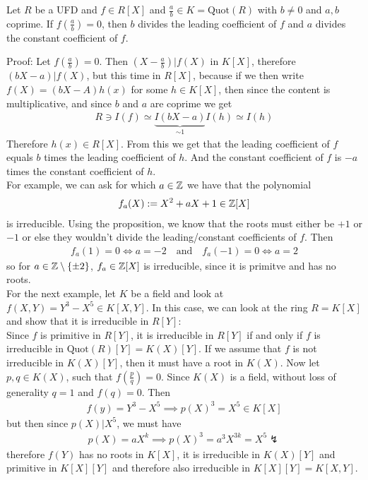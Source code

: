 \begin{proposition}[]
	Let $R$ be a UFD and $f \in R[X]$ and $\frac{a}{b} \in K = \text{Quot}(R)$ with $b \neq 0$ and $a,b$ coprime. If $f(\frac{a}{b}) = 0$, then $b$ divides the leading coefficient of $f$ and $a$ divides the constant  coefficient of $f$.
\end{proposition}
Proof: Let $f(\frac{a}{b}) = 0$. Then $(X - \frac{a}{b})|f(X)$ in $K[X]$, therefore $(bX - a)| f(X)$, but this time in $R[X]$, because if we then write $f(X) = (bX-A)h(x)$ for some $h \in K[X]$, then since the content is multiplicative, and since $b$ and $a$ are coprime we get
\begin{align*}
	R \ni I(f) \simeq \underbrace{I(b X - a)}_{\sim 1} I(h) \simeq I(h)
\end{align*}
Therefore $h(x) \in R[X]$. From this we get that the leading coefficient of $f$ equals $b$ times the leading coefficient of $h$. And the constant coefficient of $f$ is $-a$ times the constant coefficient of $h$.\\

For example, we can ask for which $a \in \mathbb{Z}$ we have that the polynomial
\begin{align*}
	f_a(X) := X^2 + a X + 1 \in \mathbb{Z}[X]
\end{align*}
is irreducible. Using the proposition, we know that the roots must either be $+1$ or $-1$ or else they wouldn't divide the leading/constant coefficients of $f$. Then
\begin{align*}
	f_a(1) = 0 \iff a = -2 \quad \text{and} \quad f_a(-1) = 0 \iff a = 2
\end{align*}
so for $a \in \mathbb{Z} \setminus \{\pm 2\}$, $f_a \in \mathbb{Z}[X]$ is irreducible, since it is primitve and has no roots.\\

For the next example, let $K$ be a field and look at $f(X,Y) = Y^3 - X^5 \in K[X,Y]$. In this case, we can look at the ring $R = K[X]$ and show that it is irreducible in $R[Y]$:\\

Since $f$ is primitive in $R[Y]$, it is irreducible in $R[Y]$ if and only if $f$ is irreducible in $\text{Quot}(R)[Y] = K(X)[Y]$. If we assume that $f$ is not irreducible in $K(X)[Y]$, then it must have a root in $K(X)$. Now let $p,q \in K(X)$, such that $f(\frac{p}{q}) = 0$. Since $K(X)$ is a field, without loss of generality $q = 1$ and $f(q) = 0$. Then 
\begin{align*}
	f(y) = Y^3 - X^5 \implies p(X)^3 = X^5 \in K[X]
\end{align*}
but then since $p(X) | X^5$, we must have
\begin{align*}
	p(X) = aX^k \implies p(X)^3 = a^3 X^{3k} = X^5 \lightning
\end{align*}
therefore $f(Y)$ has no roots in $K[X]$, it is irreducible in $K(X)[Y]$ and primitive in $K[X][Y]$ and therefore also  irreducible in $K[X][Y] = K[X,Y]$.
